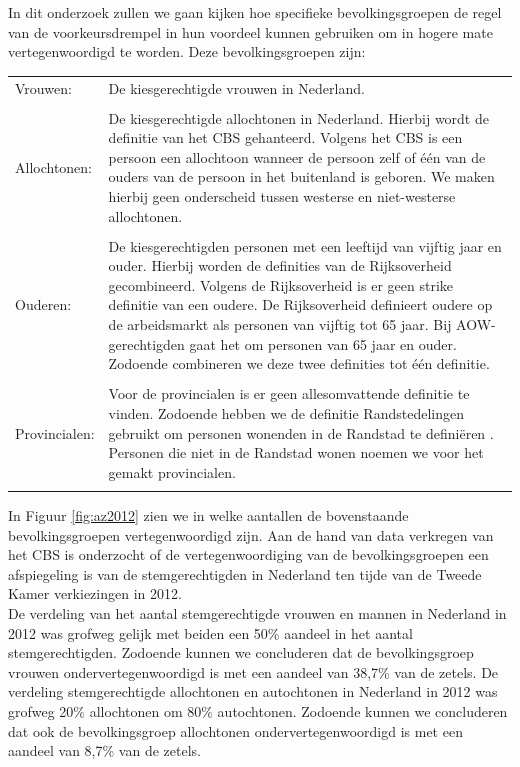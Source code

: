 In dit onderzoek zullen we gaan kijken hoe specifieke bevolkingsgroepen de regel van de voorkeursdrempel in hun voordeel kunnen gebruiken om in hogere mate vertegenwoordigd te worden. Deze bevolkingsgroepen zijn:\\

\noindent\begin{tabularx}{\textwidth}{LI}
Vrouwen: & De kiesgerechtigde vrouwen in Nederland. \\
  \\
 Allochtonen: & De kiesgerechtigde allochtonen in Nederland. Hierbij wordt de definitie van het CBS  \citeyearpar{Watve22:online} gehanteerd. Volgens het CBS is een persoon een allochtoon wanneer de persoon zelf of één van de ouders van de persoon in het buitenland is geboren. We maken hierbij geen onderscheid tussen westerse en niet-westerse allochtonen.\\
\\
  Ouderen: & De kiesgerechtigden personen met een leeftijd van vijftig jaar en ouder. Hierbij worden de definities van de Rijksoverheid \citeyearpar{Wiebe32:online} gecombineerd. Volgens de Rijksoverheid is er geen strike definitie van een oudere. De Rijksoverheid definieert oudere op de arbeidsmarkt als personen van vijftig tot 65 jaar. Bij AOW-gerechtigden gaat het om personen van 65 jaar en ouder. Zodoende combineren we deze twee definities tot één definitie.  \\
\\  
Provincialen: & Voor de provincialen is er geen allesomvattende definitie te vinden. Zodoende hebben we de definitie Randstedelingen gebruikt om personen wonenden in de Randstad te defini\"{e}ren \citep{Rands36:online}. Personen die niet in de Randstad wonen noemen we voor het gemakt provincialen. \\
  \\

\end{tabularx}

In Figuur \ref{fig:az2012} zien we in welke aantallen de bovenstaande bevolkingsgroepen vertegenwoordigd zijn. Aan de hand van data verkregen van het CBS \citeyearpar{CBS_stemgedrag} is onderzocht of de vertegenwoordiging van de bevolkingsgroepen een afspiegeling is van de stemgerechtigden in Nederland ten tijde van de Tweede Kamer verkiezingen in 2012.\\
\indent De verdeling van het aantal stemgerechtigde vrouwen en mannen in Nederland in 2012 was grofweg gelijk met beiden een 50\% aandeel in het aantal stemgerechtigden. Zodoende kunnen we concluderen dat de bevolkingsgroep vrouwen ondervertegenwoordigd is met een aandeel van 38,7\% van de zetels. 
De verdeling stemgerechtigde allochtonen en autochtonen in Nederland in 2012 was grofweg 20\% allochtonen om 80\% autochtonen. Zodoende kunnen we concluderen dat ook de bevolkingsgroep allochtonen ondervertegenwoordigd is met een aandeel van 8,7\% van de zetels. 

